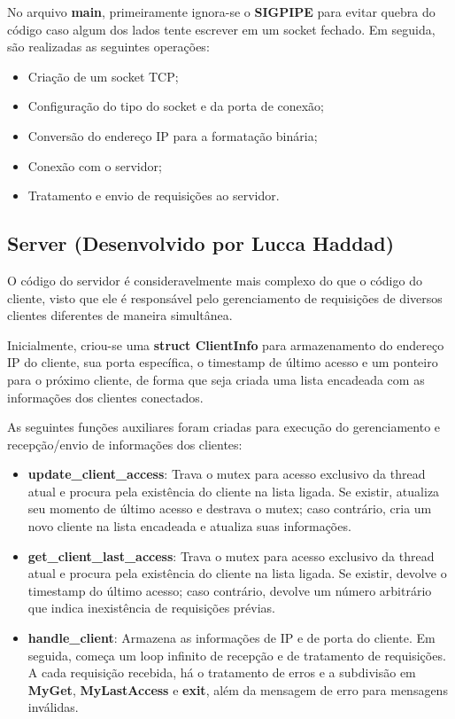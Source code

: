 \documentclass[brazil, 12pt]{article}
\begin{document}
		No arquivo \textbf{main}, primeiramente ignora-se o \textbf{SIGPIPE} para evitar quebra do código caso algum dos lados tente escrever em um socket fechado. Em seguida, são realizadas as seguintes operações:
		
		\begin{itemize}
			\item Criação de um socket TCP;
			\item Configuração do tipo do socket e da porta de conexão;
			\item Conversão do endereço IP para a formatação binária;
			\item Conexão com o servidor;
			\item Tratamento e envio de requisições ao servidor.
		\end{itemize}
	
	\subsection{Server (Desenvolvido por Lucca Haddad)}
	
		O código do servidor é consideravelmente mais complexo do que o código do cliente, visto que ele é responsável pelo gerenciamento de requisições de diversos clientes diferentes de maneira simultânea.
		
		Inicialmente, criou-se uma \textbf{struct ClientInfo} para armazenamento do endereço IP do cliente, sua porta específica, o timestamp de último acesso e um ponteiro para o próximo cliente, de forma que seja criada uma lista encadeada com as informações dos clientes conectados.
		
		As seguintes funções auxiliares foram criadas para execução do gerenciamento e recepção/envio de informações dos clientes:
		
		\begin{itemize}
			\item \textbf{update\_client\_access}: Trava o mutex para acesso exclusivo da thread atual e procura pela existência do cliente na lista ligada. Se existir, atualiza seu momento de último acesso e destrava o mutex; caso contrário, cria um novo cliente na lista encadeada e atualiza suas informações.
			\item \textbf{get\_client\_last\_access}: Trava o mutex para acesso exclusivo da thread atual e procura pela existência do cliente na lista ligada. Se existir, devolve o timestamp do último acesso; caso contrário, devolve um número arbitrário que indica inexistência de requisições prévias.
			\item \textbf{handle\_client}: Armazena as informações de IP e de porta do cliente. Em seguida, começa um loop infinito de recepção e de tratamento de requisições. A cada requisição recebida, há o tratamento de erros e a subdivisão em \textbf{MyGet}, \textbf{MyLastAccess} e \textbf{exit}, além da mensagem de erro para mensagens inválidas.
		\end{itemize}
		
\end{document}
